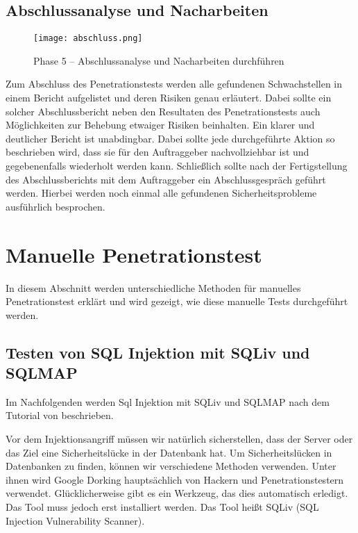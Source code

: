 \subsection{Abschlussanalyse und Nacharbeiten}

\begin{figure}[h]
	\centering
	\texttt{[image: abschluss.png]}
	\caption{Phase 5 – Abschlussanalyse und Nacharbeiten durchführen}
\end{figure}

Zum Abschluss des Penetrationstests werden alle gefundenen Schwachstellen in einem Bericht aufgelistet und deren Risiken genau erläutert. Dabei sollte ein solcher Abschlussbericht neben den Resultaten des Penetrationstests auch Möglichkeiten zur Behebung etwaiger Risiken beinhalten. Ein klarer und deutlicher Bericht ist unabdingbar. Dabei sollte jede durchgeführte Aktion so beschrieben wird, dass sie für den Auftraggeber nachvollziehbar ist und gegebenenfalls wiederholt werden kann. Schließlich sollte nach der Fertigstellung des Abschlussberichts mit dem Auftraggeber ein Abschlussgespräch geführt werden. Hierbei werden noch einmal alle gefundenen Sicherheitsprobleme ausführlich besprochen.

\section{Manuelle Penetrationstest}

In diesem Abschnitt werden unterschiedliche Methoden für manuelles Penetrationstest erklärt und wird gezeigt, wie diese manuelle Tests durchgeführt werden. 

\subsection{Testen von SQL Injektion mit SQLiv und SQLMAP}

Im Nachfolgenden werden Sql Injektion mit SQLiv und SQLMAP nach dem Tutorial von \cite{ramadhan17sqlinj} beschrieben.

Vor dem Injektionsangriff müssen wir natürlich sicherstellen, dass der Server oder das Ziel eine Sicherheitslücke in der Datenbank hat. Um Sicherheitslücken in Datenbanken zu finden, können wir verschiedene Methoden verwenden. Unter ihnen wird Google Dorking hauptsächlich von Hackern und Penetrationstestern verwendet. Glücklicherweise gibt es ein Werkzeug, das dies automatisch erledigt. Das Tool muss jedoch erst installiert werden. Das Tool heißt SQLiv (SQL Injection Vulnerability Scanner).\\

